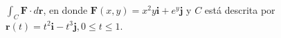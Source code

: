 \item $\int_C \mathbf{F} \cdot d\mathbf{r}$, en donde $\mathbf{F}(x, y) = x^2y\mathbf{i} + e^y\mathbf{j}$ y $C$ está descrita por $\mathbf{r}(t) = t^2\mathbf{i} - t^3\mathbf{j}, 0 \le t \le 1$.
